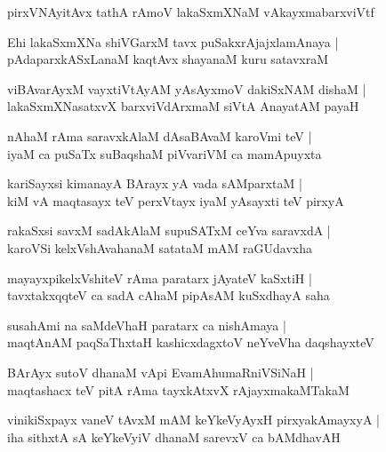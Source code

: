 \begin{shloka}
pirxVNAyitAvx tathA rAmoV lakaSxmXNaM vAkayxmabarxviVtf
\end{shloka}

\begin{shloka}
Ehi lakaSxmXNa shiVGarxM tavx puSakxrAjajxlamAnaya |\\
pAdaparxkASxLanaM kaqtAvx shayanaM kuru satavxraM 
\end{shloka}

\begin{shloka}
viBAvarAyxM vayxtiVtAyAM yAsAyxmoV dakiSxNAM dishaM |\\
lakaSxmXNasatxvX barxviVdArxmaM siVtA AnayatAM payaH 
\end{shloka}

\begin{shloka}
nAhaM rAma saravxkAlaM dAsaBAvaM karoVmi teV |\\
iyaM ca puSaTx suBaqshaM piVvariVM ca mamApuyxta
\end{shloka}

\begin{shloka}
kariSayxsi kimanayA BArayx yA vada sAMparxtaM |\\
kiM vA maqtasayx teV perxVtayx iyaM yAsayxti teV pirxyA 
\end{shloka}

\begin{shloka}
rakaSxsi savxM sadAkAlaM supuSATxM ceYva saravxdA |\\
karoVSi kelxVshAvahanaM satataM mAM raGUdavxha 
\end{shloka}

\begin{shloka}
mayayxpikelxVshiteV rAma paratarx jAyateV kaSxtiH |\\
tavxtakxqqteV ca sadA cAhaM pipAsAM kuSxdhayA saha 
\end{shloka}

\begin{shloka}
susahAmi na saMdeVhaH paratarx ca nishAmaya |\\
maqtAnAM paqSaThxtaH kashicxdagxtoV neYveVha daqshayxteV 
\end{shloka}

\begin{shloka}
BArAyx sutoV dhanaM vApi EvamAhumaRniVSiNaH |\\
maqtashacx teV pitA rAma tayxkAtxvX rAjayxmakaMTakaM
\end{shloka}

\begin{shloka}
vinikiSxpayx vaneV tAvxM mAM keYkeVyAyxH pirxyakAmayxyA |\\
iha sithxtA sA keYkeVyiV dhanaM sarevxV ca bAMdhavAH 
\end{shloka}

